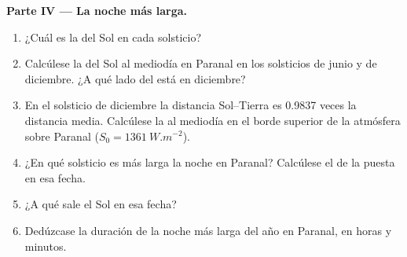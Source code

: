 \begin{problem}
\medskip
\noindent\textbf{Parte IV --- La noche más larga.}
\begin{enumerate}[resume]
  \item ¿Cuál es la  del Sol en cada solsticio?
  \item Calcúlese la  del Sol al mediodía en Paranal en los solsticios de
        junio y de diciembre. ¿A qué lado del  está en diciembre?
  \item En el solsticio de diciembre la distancia Sol--Tierra es 0.9837 veces la
        distancia media. Calcúlese la  al mediodía en el borde superior
        de la atmósfera sobre Paranal ($S_0 = \qty{1361}{W.m^{-2}}$).
  \item ¿En qué solsticio es más larga la noche en Paranal? Calcúlese el  de la puesta en esa fecha.
  \item ¿A qué  sale el Sol en esa fecha?
  \item Dedúzcase la duración de la noche más larga del año en Paranal, en horas
        y minutos.
\end{enumerate}
\end{problem}
